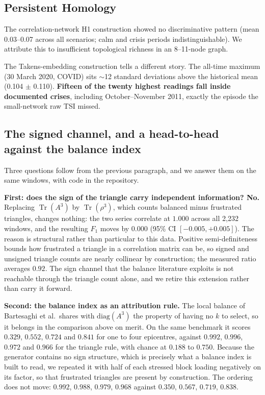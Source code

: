 \documentclass[11pt,a4paper]{article}
\begin{document}
\subsection{Persistent Homology}

The correlation-network H1 construction showed no discriminative pattern
(mean 0.03--0.07 across all scenarios; calm and crisis periods
indistinguishable). We attribute this to insufficient topological richness
in an 8--11-node graph.

The Takens-embedding construction tells a different story. The all-time
maximum (30 March 2020, COVID) sits $\sim$12 standard deviations above the
historical mean (0.104 $\pm$ 0.110). \textbf{Fifteen of the twenty highest
readings fall inside documented crises}, including October--November 2011,
exactly the episode the small-network raw TSI missed.


\subsection{The signed channel, and a head-to-head against the balance index}
\label{sec:signed}

Three questions follow from the previous paragraph, and we answer them on the
same windows, with code in the repository.

\textbf{First: does the sign of the triangle carry independent information?
No.} Replacing $\operatorname{Tr}(A^3)$ by $\operatorname{Tr}(\rho^3)$, which
counts balanced minus frustrated triangles, changes nothing: the two series
correlate at $1.000$ across all 2{,}232 windows, and the resulting $F_1$ moves
by $0.000$ (95\% CI $[-0.005, +0.005]$). The reason is structural rather than
particular to this data. Positive semi-definiteness bounds how frustrated a
triangle in a correlation matrix can be, so signed and unsigned triangle counts
are nearly collinear by construction; the measured ratio averages $0.92$. The
sign channel that the balance literature exploits is not reachable through the
triangle count alone, and we retire this extension rather than carry it
forward.

\textbf{Second: the balance index as an attribution rule.} The local balance of
Bartesaghi et al.\ shares with $\mathrm{diag}(A^3)$ the property of having no
$k$ to select, so it belongs in the comparison above on merit. On the
same benchmark it scores $0.329$, $0.552$, $0.724$ and $0.841$ for one to four
epicentres, against $0.992$, $0.996$, $0.972$ and $0.966$ for the triangle
rule, with chance at $0.188$ to $0.750$. Because the generator contains no sign
structure, which is precisely what a balance index is built to read, we
repeated it with half of each stressed block loading negatively on its factor,
so that frustrated triangles are present by construction. The ordering does not
move: $0.992$, $0.988$, $0.979$, $0.968$ against $0.350$, $0.567$, $0.719$,
$0.838$.
\end{document}
